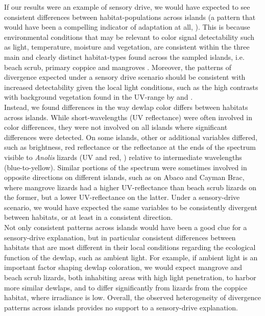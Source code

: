 If our results were an example of sensory drive, we would have expected to see consistent differences between habitat-populations across islands (a pattern that would have been a compelling indicator of adaptation at all, \citealt{Losos2011}). This is because environmental conditions that may be relevant to color signal detectability such as light, temperature, moisture and vegetation, are consistent within the three main and clearly distinct habitat-types found across the sampled islands, i.e. beach scrub, primary coppice and mangroves \citep{Howard1950, Schoener1968}. Moreover, the patterns of divergence expected under a sensory drive scenario should be consistent with increased detectability given the local light conditions, such as the high contrasts with background vegetation found in the UV-range by \citet{Leal2002} and \citet{Leal2004}.\\

Instead, we found differences in the way dewlap color differs between habitats across islands. While short-wavelengths (UV reflectance) were often involved in color differences, they were not involved on all islands where significant differences were detected. On some islands, other or additional variables differed, such as brightness, red reflectance or the reflectance at the ends of the spectrum visible to \textit{Anolis} lizards (UV and red, \citealt{Lazareva2012}) relative to intermediate wavelengths (blue-to-yellow). Similar portions of the spectrum were sometimes involved in opposite directions on different islands, such as on Abaco and Cayman Brac, where mangrove lizards had a higher UV-reflectance than beach scrub lizards on the former, but a lower UV-reflectance on the latter. Under a sensory-drive scenario, we would have expected the same variables to be consistently divergent between habitats, or at least in a consistent direction.\\

Not only consistent patterns across islands would have been a good clue for a sensory-drive explanation, but in particular consistent differences between habitats that are most different in their local conditions regarding the ecological function of the dewlap, such as ambient light. For example, if ambient light is an important factor shaping dewlap coloration, we would expect mangrove and beach scrub lizards, both inhabiting areas with high light penetration, to harbor more similar dewlaps, and to differ significantly from lizards from the coppice habitat, where irradiance is low. Overall, the observed heterogeneity of divergence patterns across islands provides no support to a sensory-drive explanation.\\

